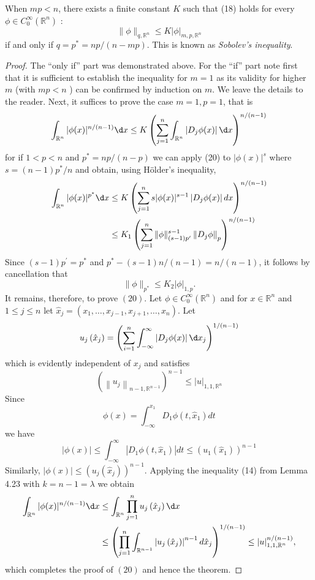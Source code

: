 \begin{theorem}
  When $m p<n$, there exists a finite constant $K$ such that (18) holds for
  every $\phi \in C_0^{\infty}\left(\mathbb{R}^n\right)$ :
  \[
  \|\phi\|_{q, \mathbb{R}^n} \leq K|\phi|_{m, p, \mathbb{R}^n}
  \]
  if and only if $q=p^*=n p /(n-m p)$. This is known as \emph{Sobolev's inequality}.
\end{theorem}

\begin{proof}
  The ``only if'' part was demonstrated above. For the ``if'' part note first that it is sufficient
  to establish the inequality for $m=1$ as its validity for higher $m$ (with $m p<n$ ) can be confirmed
  by induction on $m$. We leave the details to the reader.
  Next, it suffices to prove the case $m=1, p=1$, that is
  \[
  \int_{\mathbb{R}^n}|\phi(x)|^{n /(n-1)} \d x \leq K\left(\sum_{j=1}^n \int_{\mathbb{R}^n}\left|D_j \phi(x)\right| \d x\right)^{n /(n-1)}
  \]
  for if $1<p<n$ and $p^*=n p /(n-p)$ we can apply (20) to $|\phi(x)|^s$ where $s=(n-1) p^* / n$ and obtain, using Hölder's inequality,
  \[
  \begin{aligned}
  \int_{\mathbb{R}^n}|\phi(x)|^{p^*} \d x & \leq K\left(\sum_{j=1}^n s|\phi(x)|^{s-1}\left|D_j \phi(x)\right| d x\right)^{n /(n-1)} \\
  & \leq K_1\left(\sum_{j=1}^n\|\phi\|_{(s-1) p^{\prime}}^{s-1}\left\|D_j \phi\right\|_p\right)^{n /(n-1)}
  \end{aligned}
  \]
  Since $(s-1) p^{\prime}=p^*$ and $p^*-(s-1) n /(n-1)=n /(n-1)$, it follows by cancellation that
  \[\|\phi\|_{p^*} \leq K_2 |\phi|_{1,p}.\]
  It remains, therefore, to prove $(20)$. Let $\phi \in C_0^{\infty}\left(\mathbb{R}^n\right)$ and for $x \in \mathbb{R}^n$ and $1 \leq j \leq n$ let $\hat{x}_j=\left(x_1, \ldots, x_{j-1}, x_{j+1}, \ldots, x_n\right)$. Let
  \[
  u_j\left(\hat{x}_j\right)=\left(\sum_{i=1}^n \int_{-\infty}^{\infty}\left|D_j \phi(x)\right| \d x_j\right)^{1 /(n-1)}
  \]
  which is evidently independent of $x_j$ and satisfies
  \[
  \left(\left\|u_j\right\|_{n-1, \mathbb{R}^{n-1}}\right)^{n-1} \leq|u|_{1,1, \mathbb{R}^n}
  \]
  Since
  \[
  \phi(x)=\int_{-\infty}^{x_1} D_1 \phi\left(t, \hat{x}_1\right) d t
  \]
  we have
  \[
  |\phi(x)| \leq \int_{-\infty}^{\infty}\left|D_1 \phi\left(t, \hat{x}_1\right)\right| d t \leq\left(u_1\left(\hat{x}_1\right)\right)^{n-1}
  \]
  Similarly, $|\phi(x)| \leq\left(u_j\left(\hat{x}_j\right)\right)^{n-1}$. Applying the inequality (14) from Lemma 4.23 with $k=n-1=\lambda$ we obtain
  \[
  \begin{aligned}
  \int_{\mathbb{R}^n}|\phi(x)|^{n /(n-1)} \d x & \leq \int_{\mathbb{R}^n} \prod_{j=1}^n u_j\left(\hat{x}_j\right) \d x \\
  & \leq\left(\prod_{j=1}^n \int_{\mathbb{R}^{n-1}}\left|u_j\left(\hat{x}_j\right)\right|^{n-1} d \hat{x}_j\right)^{1 /(n-1)} \leq|u|_{1,1, \mathbb{R}^n}^{n /(n-1)},
  \end{aligned}
  \]
  which completes the proof of $(20)$ and hence the theorem.
\end{proof}


